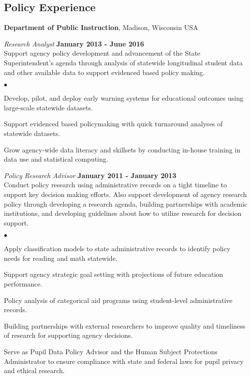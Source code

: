 \documentclass[margin,line]{res}
\newenvironment{list2}{
  \begin{list}{$\bullet$}{%
      \setlength{\itemsep}{0in}
      \setlength{\parsep}{0in} \setlength{\parskip}{0in}
      \setlength{\topsep}{0in} \setlength{\partopsep}{0in} 
      \setlength{\leftmargin}{0.2in}}}{\end{list}}
\begin{document}
\begin{resume}
\vspace*{5mm}

\section{\sc Policy Experience}
{\bf Department of Public Instruction}, Madison, Wisconsin USA

\vspace{-.3cm}
{\em Research Analyst} \hfill {\bf January 2013 - June 2016}\\
Support agency policy development and advancement of the State Superintendent's agenda through analysis of statewide longitudinal student data and other available data to support evidenced based policy making. 
\begin{list2}
\item Develop, pilot, and deploy early warning systems for educational outcomes using large-scale statewide datasets. 
\item Support evidenced based policymaking with quick turnaround analyses of statewide datasets. 
\item Grow agency-wide data literacy and skillsets by conducting in-house training in data use and statistical computing.
\end{list2}

\vspace{-.3cm}
{\em Policy Research Advisor} \hfill {\bf January 2011 - January 2013}\\
Conduct policy research using administrative records on a tight timeline to support key decision making efforts. Also support development of agency research policy through developing a research agenda, building partnerships with academic institutions, and developing guidelines about how to utilize research for decision support.
\begin{list2}
\item Apply classification models to state administrative records to identify policy needs for reading and math statewide.
\item Support agency strategic goal setting with projections of future education performance.
\item Policy analysis of categorical aid programs using student-level administrative records.
\item Building partnerships with external researchers to improve quality and timeliness of research for supporting agency decisions.
\item Serve as Pupil Data Policy Advisor and the Human Subject Protections Administrator to ensure compliance with state and federal laws for pupil privacy and ethical research.
\end{list2}


\end{resume}
\end{document}
